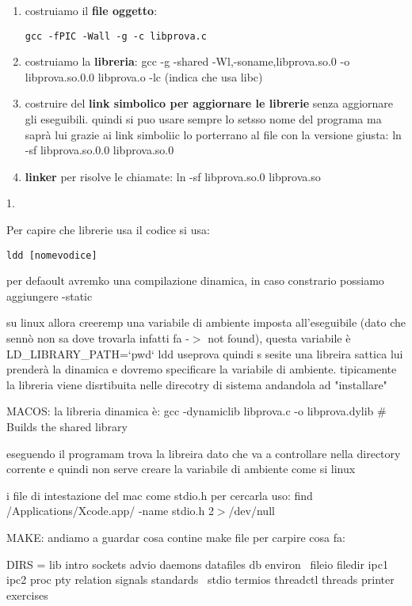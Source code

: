 \begin{enumerate}
	\item costruiamo il \textbf{file oggetto}:

\begin{lstlisting}
gcc -fPIC -Wall -g -c libprova.c
\end{lstlisting}

	\item costruiamo la \textbf{libreria}: gcc -g -shared -Wl,-soname,libprova.so.0 -o libprova.so.0.0 libprova.o -lc (indica che usa libc)
	\item costruire del \textbf{link simbolico per aggiornare le librerie} senza aggiornare gli eseguibili. quindi si puo usare sempre lo setsso nome del programa ma saprà lui grazie ai link simboliic lo porterrano al file con la versione giusta: ln -sf libprova.so.0.0 libprova.so.0 
	\item \textbf{linker} per risolve le chiamate: ln -sf libprova.so.0 libprova.so
\end{enumerate}
1. 


Per capire che librerie usa il codice si usa:

\begin{lstlisting}
ldd [nomevodice]
\end{lstlisting}

per defaoult avremko una compilazione dinamica, in caso constrario possiamo aggiungere -static

su linux allora creeremp una variabile di ambiente imposta all'eseguibile (dato che sennò non sa dove trovarla infatti fa -$>$ not found), questa variabile è LD_LIBRARY_PATH=`pwd` ldd useprova quindi s sesite una  libreira sattica lui prenderà la dinamica e dovremo specificare la variabile di ambiente. tipicamente la libreria viene disrtibuita nelle direcotry di sistema andandola ad "installare"

MACOS:
la libreria dinamica è: gcc -dynamiclib libprova.c -o libprova.dylib # Builds the shared library

eseguendo il programam trova la libreira dato che va a controllare nella directory corrente e quindi non serve creare la variabile di ambiente come si linux

i file di intestazione del mac come stdio.h per cercarla uso: find /Applications/Xcode.app/ -name stdio.h 2$>$/dev/null

MAKE:
andiamo a guardar cosa contine make file per carpire cosa fa:




DIRS = lib intro sockets advio daemons datafiles db environ \
	fileio filedir ipc1 ipc2 proc pty relation signals standards \
	stdio termios threadctl threads printer exercises

